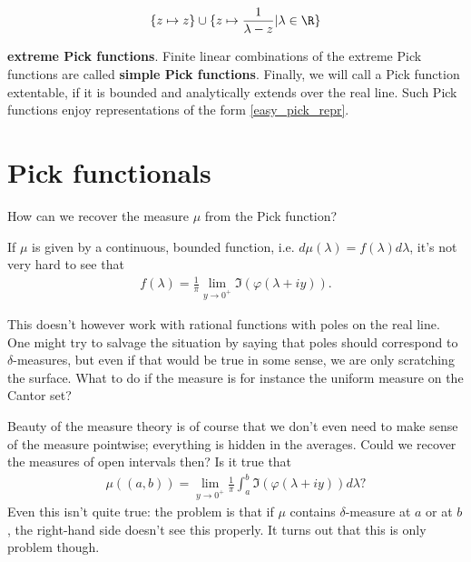\begin{align*}
	\{z \mapsto z\} \cup \{z \mapsto \frac{1}{\lambda - z} | \lambda \in \R\}
\end{align*}

\textbf{extreme Pick functions}. Finite linear combinations of the extreme Pick functions are called \textbf{simple Pick functions}. Finally, we will call a Pick function extentable, if it is bounded and analytically extends over the real line. Such Pick functions enjoy representations of the form \ref{easy_pick_repr}.
\section{Pick functionals}

\begin{quest}
	How can we recover the measure $\mu$ from the Pick function?
\end{quest}

If $\mu$ is given by a continuous, bounded function, i.e. $d \mu(\lambda) = f(\lambda) d \lambda$, it's not very hard to see that
\begin{align*}
	f(\lambda) = \frac{1}{\pi}\lim_{y \to 0^{+}} \Im(\varphi(\lambda + i y)).
\end{align*}

This doesn't however work with rational functions with poles on the real line. One might try to salvage the situation by saying that poles should correspond to $\delta$-measures, but even if that would be true in some sense, we are only scratching the surface. What to do if the measure is for instance the uniform measure on the Cantor set?

Beauty of the measure theory is of course that we don't even need to make sense of the measure pointwise; everything is hidden in the averages. Could we recover the measures of open intervals then? Is it true that
\begin{align*}
	\mu((a, b)) = \lim_{y \to 0^{+}}\frac{1}{\pi}\int_{a}^{b} \Im(\varphi(\lambda + i y)) d \lambda?
\end{align*}
Even this isn't quite true: the problem is that if $\mu$ contains $\delta$-measure at $a$ or at $b$, the right-hand side doesn't see this properly. It turns out that this is only problem though.

